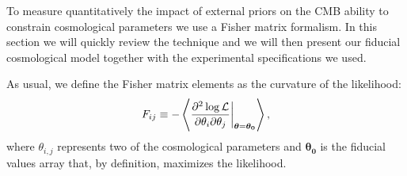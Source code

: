 \documentclass[aps,prd,reprint,superscriptaddress]{revtex4-1}
\newcommand\refeq[1]{Eq.~(\ref{eqn:#1})}
\begin{document}
To measure quantitatively the impact of external priors on the CMB ability to constrain cosmological parameters we use a Fisher matrix formalism. In this section we will quickly review the technique and we will then present our fiducial cosmological model together with the experimental specifications we used.

As usual, we define the Fisher matrix elements as the curvature of the likelihood:
\begin{equation}
	\centering
		F_{ij} \equiv - \left\langle\frac{\partial^2 \log \mathcal{L}}{\partial \theta_i \partial \theta_j} \bigg|_{\boldsymbol{\theta} = \boldsymbol{\theta_0}}\right\rangle,
	\label{eqn:Fij_def}
\end{equation}
where $\theta_{i,j}$ represents two of the cosmological parameters and $\boldsymbol{\theta_0}$ is the fiducial values array that, by definition, maximizes the likelihood. 
\end{document}
